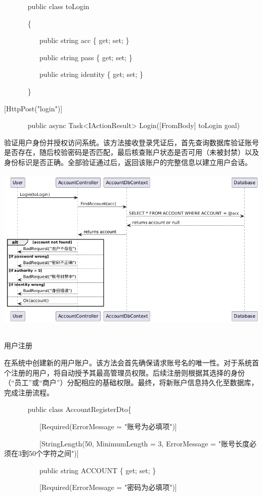 \documentclass[]{article}
\begin{document}
~ ~ ~ ~ public class toLogin

~ ~ ~ ~ \{

~ ~ ~ ~ ~ ~ public string acc \{ get; set; \}

~ ~ ~ ~ ~ ~ public string pass \{ get; set; \}

~ ~ ~ ~ ~ ~ public string identity \{ get; set; \}

~ ~ ~ ~ \}

{[}HttpPost("login"){]}

~ ~ ~ ~ public async Task\textless{}IActionResult\textgreater{}
Login({[}FromBody{]} toLogin goal)

验证用户身份并授权访问系统。该方法接收登录凭证后，首先查询数据库验证账号是否存在，随后校验密码是否匹配，最后核查账户状态是否可用（未被封禁）以及身份标识是否正确。全部验证通过后，返回该账户的完整信息以建立用户会话。\includegraphics[width=5.88681in,height=3.37778in]{media/media/image5.png}

用户注册

在系统中创建新的用户账户。该方法会首先确保请求账号名的唯一性。对于系统首个注册的用户，将自动授予其最高管理员权限。后续注册则根据其选择的身份（``员工''或``商户''）分配相应的基础权限。最终，将新账户信息持久化至数据库，完成注册流程。

~ ~ ~ ~ public class AccountRegisterDto\{

~ ~ ~ ~ ~ ~ {[}Required(ErrorMessage = "账号为必填项"){]}

~ ~ ~ ~ ~ ~ {[}StringLength(50, MinimumLength = 3, ErrorMessage =
"账号长度必须在3到50个字符之间"){]}

~ ~ ~ ~ ~ ~ public string ACCOUNT \{ get; set; \}

~ ~ ~ ~ ~ ~ {[}Required(ErrorMessage = "密码为必填项"){]}
\end{document}
